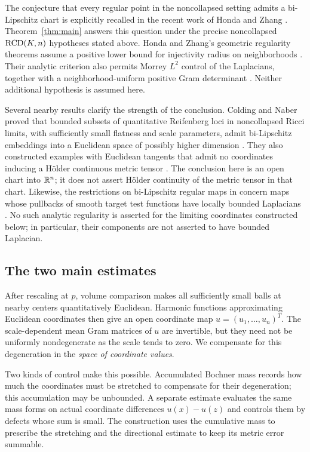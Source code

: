 The conjecture that every regular point in the noncollapsed setting
admits a bi-Lipschitz chart is explicitly recalled in the recent work
of Honda and Zhang \cite[Section~1.2]{HZ26}. Theorem~\ref{thm:main}
answers this question under the precise noncollapsed \(\mathrm{RCD}(K,n)\)
hypotheses stated above. Honda and Zhang's geometric regularity
theorems assume a positive lower bound for injectivity radius on
neighborhoods \cite[Theorems~1.1 and 3.35]{HZ26}. Their analytic
criterion also permits Morrey \(L^2\) control of the Laplacians,
together with a neighborhood-uniform positive Gram determinant
\cite[Theorem~3.9 and Proposition~3.10]{HZ26}. Neither additional
hypothesis is assumed here.

Several nearby results clarify the strength of the conclusion.
Colding and Naber proved that bounded subsets of quantitative
Reifenberg loci in noncollapsed Ricci limits, with sufficiently small
flatness and scale parameters, admit bi-Lipschitz embeddings into a
Euclidean space of possibly higher dimension
\cite[Theorem~1.1]{CN13}. They also constructed examples with
Euclidean tangents that admit no coordinates inducing a H\"older
continuous metric tensor \cite[Theorem~1.2]{CN13}. The conclusion here
is an open chart into \(\mathbb R^n\); it does not assert H\"older continuity
of the metric tensor in that chart. Likewise, the restrictions on
bi-Lipschitz regular maps in \cite[Proposition~5.1]{HP23} concern
maps whose pullbacks of smooth target test functions have locally
bounded Laplacians \cite[Definition~3.1]{HP23}. No such analytic
regularity is asserted for the limiting coordinates constructed
below; in particular, their components are not asserted to have
bounded Laplacian.

\subsection{The two main estimates}

After rescaling at \(p\), volume comparison makes all sufficiently
small balls at nearby centers quantitatively Euclidean. Harmonic
functions approximating Euclidean coordinates then give an open
coordinate map \(u=(u_1,\ldots,u_n)^T\). The scale-dependent mean Gram matrices of \(u\)
are invertible, but they need not be uniformly nondegenerate as the
scale tends to zero. We compensate for this degeneration in the
\emph{space of coordinate values}.

Two kinds of control make this possible.  Accumulated Bochner mass
records how much the coordinates must be stretched to compensate for
their degeneration; this accumulation may be unbounded.  A separate
estimate evaluates the same mass forms on actual coordinate differences
$u(x)-u(z)$ and controls them by defects whose sum is small.  The
construction uses the cumulative mass to prescribe the stretching and
the directional estimate to keep its metric error summable.

